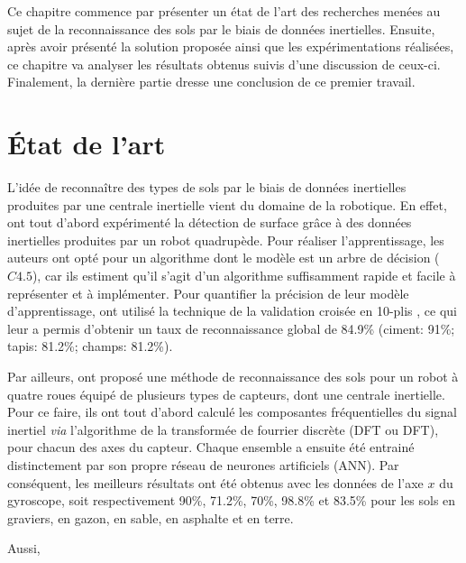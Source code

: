 Ce chapitre commence par présenter un état de l'art des recherches menées au sujet de la reconnaissance des sols par le biais de données inertielles. Ensuite, après avoir présenté la solution proposée ainsi que les expérimentations réalisées, ce chapitre va analyser les résultats obtenus suivis d'une discussion de ceux-ci. Finalement, la dernière partie dresse une conclusion de ce premier travail.

\section{État de l'art}

L'idée de reconnaître des types de sols par le biais de données inertielles produites par une centrale inertielle vient du domaine de la robotique. En effet, \cite{Vail2004} ont tout d'abord expérimenté la détection de surface grâce à des données inertielles produites par un robot quadrupède. Pour réaliser l'apprentissage, les auteurs ont opté pour un algorithme dont le modèle est un arbre de décision ($C4.5$), car ils estiment qu'il s'agit d'un algorithme suffisamment rapide et facile à représenter et à implémenter. Pour quantifier la précision de leur modèle d'apprentissage, \citeauthor{Vail2004} ont utilisé la technique de la validation croisée en 10-plis \citep{Kohavi1995}, ce qui leur a permis d'obtenir un taux de reconnaissance global de 84.9\% (ciment: 91\%; tapis: 81.2\%; champs: 81.2\%).

Par ailleurs, \cite{Bibuli2007} ont proposé une méthode de reconnaissance des sols pour un robot à quatre roues équipé de plusieurs types de capteurs, dont une centrale inertielle. Pour ce faire, ils ont tout d'abord calculé les composantes fréquentielles du signal inertiel \textit{via} l'algorithme de la transformée de fourrier discrète (\acl{DFT} ou \acs{DFT}), pour chacun des axes du capteur. Chaque ensemble a ensuite été entrainé distinctement par son propre réseau de neurones artificiels (\acs{ANN}). Par conséquent, les meilleurs résultats ont été obtenus avec les données de l'axe $x$ du gyroscope, soit respectivement 90\%, 71.2\%, 70\%, 98.8\% et 83.5\% pour les sols en graviers, en gazon, en sable, en asphalte et en terre.

Aussi, \cite{Weiss2007} 


